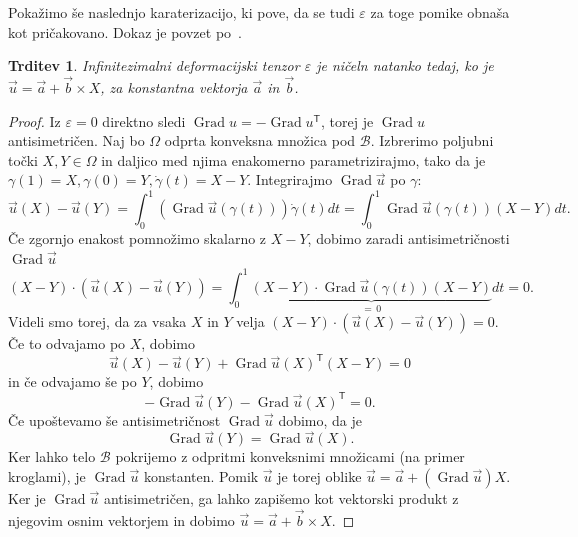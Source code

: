 \documentclass[12pt,a4paper,twoside]{article}
\theoremstyle{definition} %
\theoremstyle{plain} %
\newtheorem{trditev}[definicija]{Trditev}
\numberwithin{equation}{section}
\newcommand{\B}{\mathcal{B}}
\newcommand{\T}{\mathsf{T}}
\newcommand{\Grad}{\operatorname{Grad}}
\newcommand{\eps}{\varepsilon}
\newcommand{\vu}{\vec{u}}
\newcommand{\va}{\vec{a}}
\newcommand{\vb}{\vec{b}}
\newcommand{\vX}{X}
\newcommand{\vY}{Y}
\begin{document}
Pokažimo še naslednjo karaterizacijo, ki pove, da se tudi $\eps$ za toge pomike
obnaša kot pričakovano. Dokaz je povzet po~\cite[str.\ 56]{gurtin1982introduction}.
\begin{trditev}
  \label{trd:eps-0}
  Infinitezimalni deformacijski tenzor $\eps$ je ničeln natanko tedaj, ko je
  $\vu = \va + \vb \times \vX$, za konstantna vektorja $\va$ in $\vb$.
\end{trditev}
\begin{proof}
  Iz $\eps = 0$ direktno sledi $\Grad u = -\Grad u^\T$, torej je $\Grad u$ antisimetričen.
  Naj bo $\Omega$ odprta konveksna množica pod $\B$.  Izbrerimo poljubni točki $\vX, \vY \in \Omega$
  in daljico med njima enakomerno parametrizirajmo, tako da je $\gamma(1) = \vX, \gamma(0) = \vY,
  \dot\gamma(t) = \vX-\vY$. Integrirajmo $\Grad \vu$ po $\gamma$:
  \[
    \vu(\vX) - \vu(\vY) = \int_0^1 (\Grad\vu(\gamma(t)))\dot\gamma(t)dt =
    \int_0^1\Grad\vu(\gamma(t))(\vX-\vY) dt.
  \]
  Če zgornjo enakost pomnožimo skalarno z $\vX-\vY$, dobimo zaradi antisimetričnosti $\Grad \vu$
  \[
    (\vX - \vY)\cdot (\vu(\vX) - \vu(\vY)) =
    \int_0^1\underbrace{(\vX - \vY)\cdot \Grad\vu(\gamma(t))(\vX-\vY)}_{=\,0} dt = 0.
  \]
  Videli smo torej, da za vsaka $\vX$ in $\vY$ velja $(\vX - \vY)\cdot (\vu(\vX) - \vu(\vY)) = 0$.
  Če to odvajamo po $\vX$, dobimo
  \[
    \vu(\vX) - \vu(\vY) + \Grad\vu(\vX)^\T(\vX - \vY) = 0
  \]
  in če odvajamo še po $Y$, dobimo
  \[
    - \Grad \vu(\vY) - \Grad\vu(\vX)^\T = 0.
  \]
  Če upoštevamo še antisimetričnost $\Grad\vu$ dobimo, da je
  \[
    \Grad \vu(\vY) = \Grad\vu(\vX).
  \]
  Ker lahko telo $\B$ pokrijemo z odpritmi konveksnimi množicami (na primer kroglami),
  je $\Grad\vu$ konstanten. Pomik $\vu$ je torej oblike $\vu = \va + (\Grad\vu) \vX$.
  Ker je $\Grad \vu$ antisimetričen, ga lahko zapišemo kot vektorski produkt z
  njegovim osnim vektorjem in dobimo $\vu = \va + \vb \times \vX$.
\end{proof}
\end{document}
